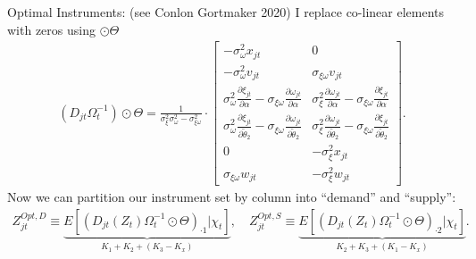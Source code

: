 \begin{frame}{Optimal Instruments: (see Conlon Gortmaker 2020) }
\noindent I replace co-linear elements with zeros using $\odot \Theta$
\begin{align*}
    (D_{jt} \Omega_t^{-1} ) \odot \Theta =  \frac{1}{\sigma_\xi^2 \sigma_\omega^2 - \sigma_{\xi \omega}^2} \cdot 
    \begin{bmatrix}
        -\sigma_\omega^2 x_{jt} & 0  \\
        -\sigma_\omega^2 v_{jt} & \sigma_{\xi \omega} v_{jt} \\
        \sigma_\omega^2 \frac{\partial \xi_{jt}}{\partial \alpha} - 
        \sigma_{\xi\omega}\frac{\partial \omega_{jt}}{\partial \alpha} 
        & \sigma_{\xi}^2 \frac{\partial \omega_{jt}}{\partial \alpha}  - 
        \sigma_{\xi\omega}\frac{\partial \xi_{jt}}{\partial \alpha}  \\
        \sigma_\omega^2 \frac{\partial \xi_{jt}}{\partial \widetilde{\theta}_2}  -
        \sigma_{\xi\omega}\frac{\partial \omega_{jt}}{\partial \widetilde{\theta}_2} 
        & \sigma_{\xi}^2 \frac{\partial \omega_{jt}}{\partial \widetilde{\theta}_2} - 
        \sigma_{\xi\omega}\frac{\partial \xi_{jt}}{\partial \widetilde{\theta}_2}\\
        0 &  -\sigma_{\xi}^2 x_{jt} \\
        \sigma_{\xi\omega} w_{jt} & -\sigma_{\xi}^2 w_{jt}
    \end{bmatrix}
    .
\end{align*}
\noindent Now we can partition our instrument set by column into ``demand'' and ``supply'': 
\begin{align*}
    Z_{jt}^{\textit{Opt},D} \equiv \underbrace{E[(D_{jt}(Z_t) \Omega_t^{-1} \odot \Theta)_{\cdot 1} | \chi_t]}_{K_1 + K_2 + (K_3 - K_x)}, \quad Z_{jt}^{\textit{Opt},S} \equiv \underbrace{E[(D_{jt}(Z_t)\Omega_t^{-1} \odot \Theta)_{\cdot 2} | \chi_t]}_{K_2 + K_3+ (K_1 - K_x)}.
\end{align*}
\end{frame}


